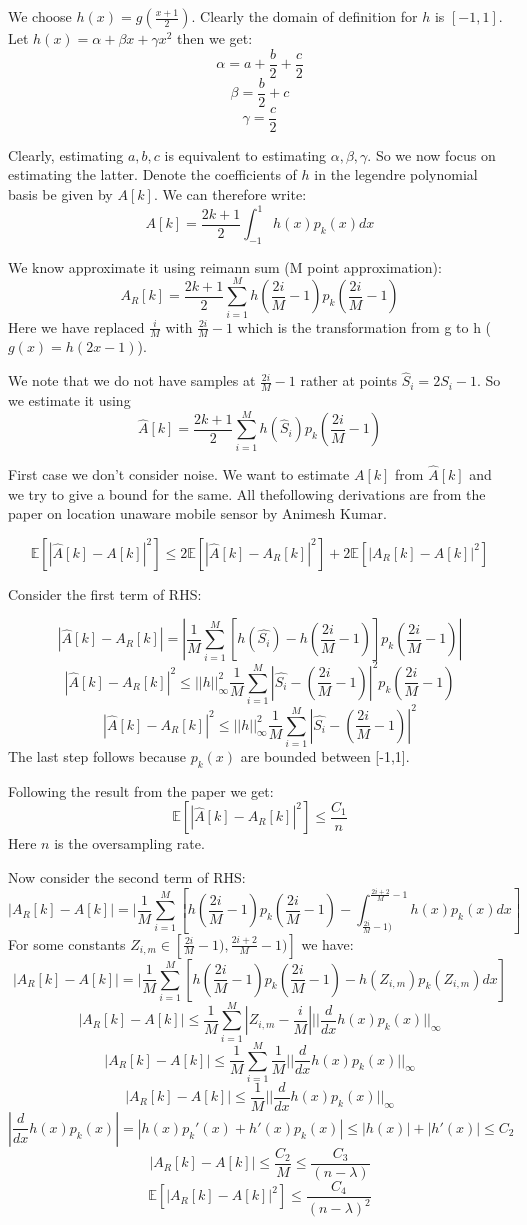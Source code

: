\documentclass{article}
\begin{document}
We choose $h(x) = g(\frac{x+1}{2})$. Clearly the domain of definition for $h$ is $[-1, 1]$. Let $h(x) = \alpha + \beta x + \gamma x^2$ then we get:
$$\alpha = a + \frac{b}{2} + \frac{c}{2}$$
$$\beta = \frac{b}{2} + c$$
$$\gamma = \frac{c}{2}$$

Clearly, estimating $a, b, c$ is equivalent to estimating $\alpha, \beta, \gamma$. So we now focus on estimating the latter. Denote the coefficients of $h$ in the legendre polynomial basis be given by $A[k]$. We can therefore write:
$$A[k] = \frac{2k+1}{2} \int_{-1}^1 h(x) p_k(x) dx$$

We know approximate it using reimann sum (M point approximation):
$$A_R[k] = \frac{2k+1}{2} \sum_{i=1}^M h(\frac{2i}{M}-1) p_k(\frac{2i}{M} -1)$$
Here we have replaced $\frac{i}{M}$ with $\frac{2i}{M}-1$ which is the transformation from g to h ($g(x) = h(2x-1)$).

We note that we do not have samples at $\frac{2i}{M} -1$ rather at points $\hat{S}_i = 2 S_i - 1$. So we estimate it using
$$\hat{A}[k] = \frac{2k+1}{2} \sum_{i=1}^M h(\hat{S}_i) p_k(\frac{2i}{M} -1)$$

First case we don't consider noise. We want to estimate $A[k]$ from $\hat{A}[k]$ and we try to give a bound for the same. All thefollowing derivations are from the paper on location unaware mobile sensor by Animesh Kumar.

$$\mathbb{E}[|\hat{A}[k] - A[k]|^2] \le 2 \mathbb{E}[|\hat{A}[k] - A_R[k]|^2] + 2 \mathbb{E}[|A_R[k] - A[k]|^2]$$

Consider the first term of RHS:

$$|\hat{A}[k] - A_R[k]| = |\frac{1}{M}\sum_{i=1}^M[h(\hat{S_i}) - h(\frac{2i}{M} -1)]p_k(\frac{2i}{M} -1)|$$
$$|\hat{A}[k] - A_R[k]|^2 \le ||h||_{\infty}^2 \frac{1}{M}\sum_{i=1}^M |\hat{S_i} - (\frac{2i}{M} -1)|^2 p_k(\frac{2i}{M}-1)$$
$$|\hat{A}[k] - A_R[k]|^2 \le ||h||_{\infty}^2 \frac{1}{M}\sum_{i=1}^M |\hat{S_i} - (\frac{2i}{M} -1)|^2$$
The last step follows because $p_k(x)$ are bounded between [-1,1].

Following the result from the paper we get:
$$\mathbb{E}[|\hat{A}[k] - A_R[k]|^2] \le \frac{C_1}{n}$$
Here $n$ is the oversampling rate.

Now consider the second term of RHS:
$$|A_R[k] - A[k]| = |\frac{1}{M} \sum_{i=1}^M [h(\frac{2i}{M} -1)p_k(\frac{2i}{M} -1) - \int_{\frac{2i}{M} -1)}^{\frac{2i+2}{M}-1}h(x)p_k(x)dx]$$
For some constants $Z_{i,m} \in [\frac{2i}{M} -1), \frac{2i+2}{M} -1)]$ we have:
$$|A_R[k] - A[k]| = |\frac{1}{M} \sum_{i=1}^M [h(\frac{2i}{M} -1)p_k(\frac{2i}{M} -1) - h(Z_{i,m})p_k(Z_{i,m})dx]$$
$$|A_R[k] - A[k]| \le \frac{1}{M}\sum_{i=1}^M |Z_{i,m} - \frac{i}{M}| ||\frac{d}{dx}h(x)p_k(x)||_{\infty}$$
$$|A_R[k] - A[k]| \le \frac{1}{M}\sum_{i=1}^M \frac{1}{M} ||\frac{d}{dx}h(x)p_k(x)||_{\infty}$$
$$|A_R[k] - A[k]| \le \frac{1}{M} ||\frac{d}{dx}h(x)p_k(x)||_{\infty}$$
$$|\frac{d}{dx}h(x)p_k(x)| = |h(x)p_k'(x) + h'(x)p_k(x)| \le |h(x)| + |h'(x)| \le C_2$$
$$|A_R[k] - A[k]| \le \frac{C_2}{M} \le \frac{C_3}{(n-\lambda)}$$
$$\mathbb{E}[|A_R[k] - A[k]|^2] \le \frac{C_4}{(n-\lambda)^2}$$
\end{document}
